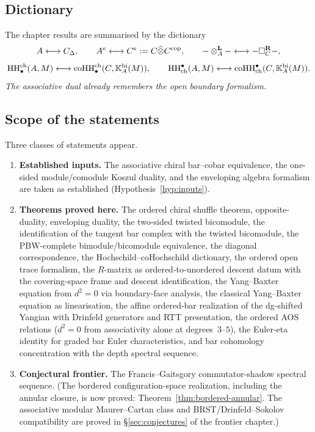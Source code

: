 \subsection*{Dictionary}
The chapter results are summarised by the dictionary
\[
A \longleftrightarrow C_\Delta,\qquad
A^e \longleftrightarrow C^e:=C\widehat\otimes C^{\mathrm{cop}},\qquad
-\otimes_A^{\mathbf L}- \longleftrightarrow -\square_C^{\mathbf R}-,
\]
\[
\operatorname{HH}^{\mathrm{ch}}_\bullet(A,M)
\longleftrightarrow
\operatorname{coHH}^{\mathrm{ch}}_\bullet(C,\mathbb{K}_A^{\mathrm{bi}}(M)),
\qquad
\operatorname{HH}_{\mathrm{ch}}^\bullet(A,M)
\longleftrightarrow
\operatorname{coHH}_{\mathrm{ch}}^\bullet(C,\mathbb{K}_A^{\mathrm{bi}}(M)).
\]
\emph{The associative dual already remembers the open boundary formalism.}

\subsection*{Scope of the statements}
Three classes of statements appear.

\begin{enumerate}[label=(\roman*)]
\item \textbf{Established inputs.}
The associative chiral bar--cobar equivalence, the one-sided
module/comodule Koszul duality, and the enveloping algebra formalism
are taken as established (Hypothesis~\ref{hyp:inputs}).

\item \textbf{Theorems proved here.}
The ordered chiral shuffle theorem, opposite-duality, enveloping duality, the two-sided twisted
bicomodule, the identification of the tangent bar complex with the twisted bicomodule, the PBW-complete
bimodule/bicomodule equivalence, the diagonal correspondence, the Hochschild--coHochschild
dictionary, the ordered open trace formalism, the $R$-matrix as
ordered-to-unordered descent datum with the covering-space frame and descent identification,
the Yang--Baxter equation from $d^2=0$ via boundary-face analysis, the classical
Yang--Baxter equation as linearisation, the affine ordered-bar
realization of the dg-shifted Yangian with Drinfeld generators and
RTT presentation, the ordered AOS relations ($d^2=0$ from
associativity alone at degrees~$3$--$5$), the Euler-eta identity for
graded bar Euler characteristics, and bar cohomology concentration with
the depth spectral sequence.

\item \textbf{Conjectural frontier.}
The Francis--Gaitsgory commutator-shadow spectral
sequence. (The bordered configuration-space realization, including the annular closure,
is now proved: Theorem~\ref{thm:bordered-annular}. The associative modular Maurer--Cartan
class and BRST/Drinfeld--Sokolov compatibility are proved in
\S\ref*{sec:conjectures} of the frontier chapter.)
\end{enumerate}

